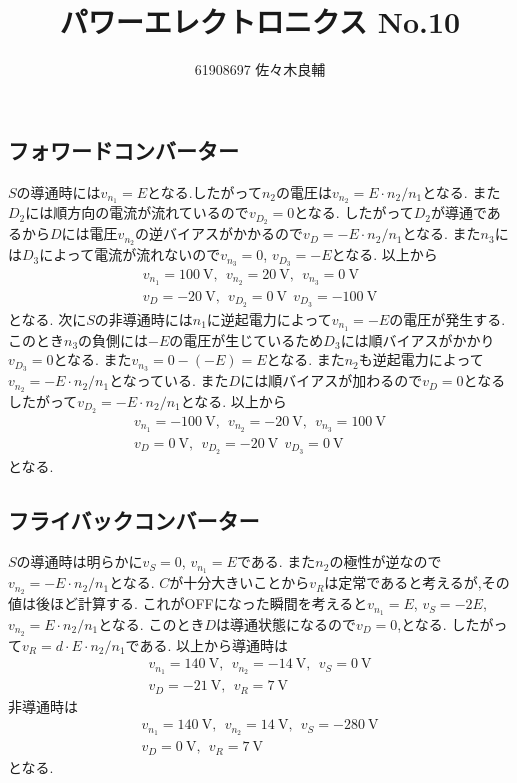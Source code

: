 \documentclass[uplatex,a4j,11pt,dvipdfmx]{jsarticle}
\begin{document}
\title{パワーエレクトロニクス No.10}
\author{61908697 佐々木良輔}
\date{}
\maketitle
\subsection*{フォワードコンバーター}
$S$の導通時には$v_{n_1}=E$となる.したがって$n_2$の電圧は$v_{n_2}=E\cdot n_2/n_1$となる.
また$D_2$には順方向の電流が流れているので$v_{D_2}=0$となる.
したがって$D_2$が導通であるから$D$には電圧$v_{n_2}$の逆バイアスがかかるので$v_D=-E\cdot n_2/n_1$となる.
また$n_3$には$D_3$によって電流が流れないので$v_{n_3}=0$, $v_{D_3}=-E$となる.
以上から
\begin{align*}
  v_{n_1}=100\ \si{\volt},\ \ v_{n_2}=20\ \si{\volt},\ \ v_{n_3}=0\ \si{\volt}\\
  v_D=-20\ \si{\volt},\ \ v_{D_2}=0\ \si{\volt}\ \ v_{D_3}=-100\ \si{\volt}
\end{align*}
となる.
次に$S$の非導通時には$n_1$に逆起電力によって$v_{n_1}=-E$の電圧が発生する.
このとき$n_3$の負側には$-E$の電圧が生じているため$D_3$には順バイアスがかかり$v_{D_3}=0$となる.
また$v_{n_3}=0-(-E)=E$となる.
また$n_2$も逆起電力によって$v_{n_2}=-E\cdot n_2/n_1$となっている.
また$D$には順バイアスが加わるので$v_D=0$となる
したがって$v_{D_2}=-E\cdot n_2/n_1$となる.
以上から
\begin{align*}
  v_{n_1}=-100\ \si{\volt},\ \ v_{n_2}=-20\ \si{\volt},\ \ v_{n_3}=100\ \si{\volt}\\
  v_D=0\ \si{\volt},\ \ v_{D_2}=-20\ \si{\volt}\ \ v_{D_3}=0\ \si{\volt}
\end{align*}
となる.
\subsection*{フライバックコンバーター}
$S$の導通時は明らかに$v_S=0$, $v_{n_1}=E$である.
また$n_2$の極性が逆なので$v_{n_2}=-E\cdot n_2/n_1$となる.
$C$が十分大きいことから$v_R$は定常であると考えるが,その値は後ほど計算する.
これがOFFになった瞬間を考えると$v_{n_1}=E$, $v_S=-2E$, $v_{n_2}=E\cdot n_2/n_1$となる.
このとき$D$は導通状態になるので$v_D=0$,となる.
したがって$v_R=d\cdot E\cdot n_2/n_1$である.
以上から導通時は
\begin{align*}
  v_{n_1}=140\ \si{\volt},\ \ v_{n_2}=-14\ \si{\volt},\ \ v_{S}=0\ \si{\volt}\\
  v_{D}=-21\ \si{\volt},\ \ v_{R}=7\ \si{\volt}
\end{align*}
非導通時は
\begin{align*}
  v_{n_1}=140\ \si{\volt},\ \ v_{n_2}=14\ \si{\volt},\ \ v_{S}=-280\ \si{\volt}\\
  v_{D}=0\ \si{\volt},\ \ v_{R}=7\ \si{\volt}
\end{align*}
となる.
\end{document}
